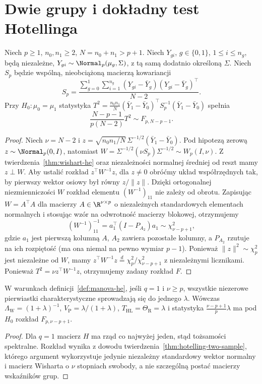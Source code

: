 \section{Dwie grupy i dokładny test Hotellinga}
\begin{twierdzenie}\label{thm:hotelling-two-sample}
Niech $p\ge1$, $n_0,n_1\ge2$, $N=n_0+n_1>p+1$. Niech $Y_{gi}$, $g\in\{0,1\}$, $1\le i\le n_g$, będą niezależne, $Y_{gi}\sim\Normal_p(\mu_g,\Sigma)$, z tą samą dodatnio określoną $\Sigma$. Niech $S_p$ będzie wspólną, nieobciążoną macierzą kowariancji
\[
 S_p=\frac{\sum_{g=0}^1\sum_{i=1}^{n_g}(Y_{gi}-\bar Y_g)(Y_{gi}-\bar Y_g)^\top}{N-2}.
\]
Przy $H_0:\mu_0=\mu_1$ statystyka $T^2=\frac{n_0n_1}{N}(\bar Y_1-\bar Y_0)^\top S_p^{-1}(\bar Y_1-\bar Y_0)$ spełnia
\[
 \frac{N-p-1}{p(N-2)}T^2\sim F_{p,N-p-1}.
\]
\end{twierdzenie}
\begin{proof}
Niech $\nu=N-2$ i $z=\sqrt{n_0n_1/N}\,\Sigma^{-1/2}(\bar Y_1-\bar Y_0)$. Pod hipotezą zerową $z\sim\Normal_p(0,I)$, natomiast $W=\Sigma^{-1/2}(\nu S_p)\Sigma^{-1/2}\sim W_p(I,\nu)$. Z twierdzenia~\ref{thm:wishart-he} oraz niezależności normalnej średniej od reszt mamy $z\perp W$. Aby ustalić rozkład $z^\top W^{-1}z$, dla $z\ne0$ obróćmy układ współrzędnych tak, by pierwszy wektor osiowy był równy $z/\|z\|$. Dzięki ortogonalnej niezmienniczości $W$ rozkład elementu $(W^{-1})_{11}$ nie zależy od obrotu. Zapisując $W=A^\top A$ dla macierzy $A\in\R^{\nu\times p}$ o niezależnych standardowych elementach normalnych i stosując wzór na odwrotność macierzy blokowej, otrzymujemy
\[
 (W^{-1})_{11}^{-1}=a_1^\top(I-P_{A_2})a_1\sim\chi^2_{\nu-p+1},
\]
gdzie $a_1$ jest pierwszą kolumną $A$, $A_2$ zawiera pozostałe kolumny, a $P_{A_2}$ rzutuje na ich rozpiętość (ma ona niemal na pewno wymiar $p-1$). Ponieważ $\|z\|^2\sim\chi^2_p$ jest niezależne od $W$, mamy $z^\top W^{-1}z\stackrel d=\chi_p^2/\chi_{\nu-p+1}^2$ z niezależnymi licznikami. Ponieważ $T^2=\nu z^\top W^{-1}z$, otrzymujemy zadany rozkład $F$.
\end{proof}

\begin{wniosek}\label{cor:manova-rankone}
W warunkach definicji~\ref{def:manova-he}, jeśli $q=1$ i $\nu\ge p$, wszystkie niezerowe pierwiastki charakterystyczne sprowadzają się do jednego $\lambda$. Wówczas $\Lambda_{\mathrm W}=(1+\lambda)^{-1}$, $V_{\mathrm P}=\lambda/(1+\lambda)$, $T_{\mathrm{HL}}=\Theta_{\mathrm R}=\lambda$ i statystyka $\frac{\nu-p+1}{p}\lambda$ ma pod $H_0$ rozkład $F_{p,\nu-p+1}$.
\end{wniosek}
\begin{proof}
Dla $q=1$ macierz $H$ ma rząd co najwyżej jeden, stąd tożsamości spektralne. Rozkład wynika z dowodu twierdzenia~\ref{thm:hotelling-two-sample}, którego argument wykorzystuje jedynie niezależny standardowy wektor normalny i macierz Wisharta o $\nu$ stopniach swobody, a nie szczególną postać macierzy wskaźników grup.
\end{proof}

